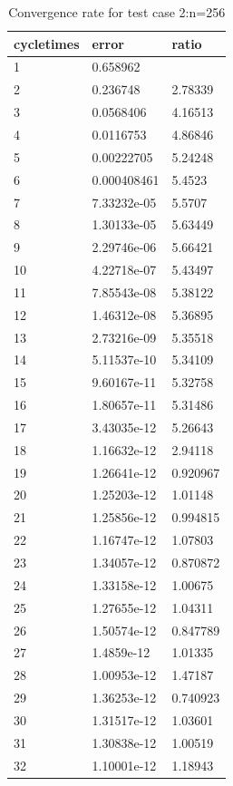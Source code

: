 \documentclass[UTF8]{ctexart}
\theoremstyle{plain}
\theoremstyle{definition}
\theoremstyle{remark}
\begin{document}
\begin{table}[H]
\centering
\begin{tabular}{|l|l|l|}
\hline
cycletimes & error & ratio\\\hline
1 & 0.658962&\\ \hline
2 & 0.236748& 2.78339\\ \hline
3 & 0.0568406& 4.16513\\ \hline
4 & 0.0116753& 4.86846\\ \hline
5 & 0.00222705& 5.24248\\ \hline
6 & 0.000408461& 5.4523\\ \hline
7 & 7.33232e-05& 5.5707\\ \hline
8 & 1.30133e-05& 5.63449\\ \hline
9 & 2.29746e-06& 5.66421\\ \hline
10 & 4.22718e-07& 5.43497\\ \hline
11 & 7.85543e-08& 5.38122\\ \hline
12 & 1.46312e-08& 5.36895\\ \hline
13 & 2.73216e-09& 5.35518\\ \hline
14 & 5.11537e-10& 5.34109\\ \hline
15 & 9.60167e-11& 5.32758\\ \hline
16 & 1.80657e-11& 5.31486\\ \hline
17 & 3.43035e-12& 5.26643\\ \hline
18 & 1.16632e-12& 2.94118\\ \hline
19 & 1.26641e-12& 0.920967\\ \hline
20 & 1.25203e-12& 1.01148\\ \hline
21 & 1.25856e-12& 0.994815\\ \hline
22 & 1.16747e-12& 1.07803\\ \hline
23 & 1.34057e-12& 0.870872\\ \hline
24 & 1.33158e-12& 1.00675\\ \hline
25 & 1.27655e-12& 1.04311\\ \hline
26 & 1.50574e-12& 0.847789\\ \hline
27 & 1.4859e-12& 1.01335\\ \hline
28 & 1.00953e-12& 1.47187\\ \hline
29 & 1.36253e-12& 0.740923\\ \hline
30 & 1.31517e-12& 1.03601\\ \hline
31 & 1.30838e-12& 1.00519\\ \hline
32 & 1.10001e-12& 1.18943\\ \hline
\end{tabular}
\caption{Convergence rate for test case 2:n=256}
\end{table}
\end{document}
